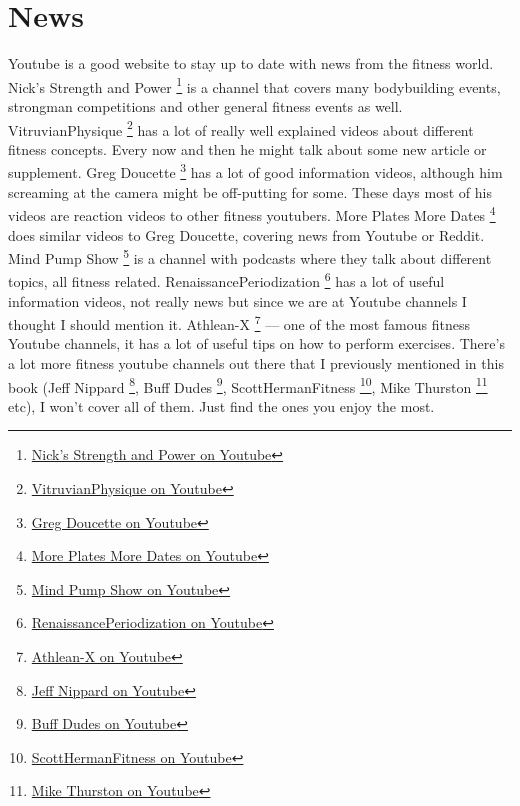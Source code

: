 \documentclass[openany, 12pt]{book}
\begin{document}
  	\section{News}

        Youtube is a good website to stay up to date with news from the fitness world. Nick's Strength and Power
        \footnote{\href{https://www.youtube.com/c/NicksStrengthandPower/videos}{Nick's Strength and Power on Youtube}} is a channel that covers many bodybuilding events, strongman competitions and
        other general fitness events as well. VitruvianPhysique
        \footnote{\href{https://www.youtube.com/user/VitruvianPhysique}{VitruvianPhysique on Youtube}} has a lot of really well explained videos about different fitness concepts. Every now
        and then he might talk about some new article or supplement. Greg Doucette
        \footnote{\href{https://www.youtube.com/user/gregdoucette/videos}{Greg Doucette on Youtube}} has a lot of good information videos, although him screaming at the camera might be
        off-putting for some. These days most of his videos are reaction videos to other fitness youtubers. More Plates More Dates
        \footnote{\href{https://www.youtube.com/c/MorePlatesMoreDates/videos}{More Plates More Dates on Youtube}} does similar videos to Greg Doucette, covering news from Youtube or
        Reddit. Mind Pump Show
        \footnote{\href{https://www.youtube.com/c/MindPumpShow/videos}{Mind Pump Show on Youtube}} is a channel with podcasts where they talk about different topics, all fitness related.
        RenaissancePeriodization
        \footnote{\href{https://www.youtube.com/c/RenaissancePeriodization/videos}{RenaissancePeriodization on Youtube}} has a lot of useful information videos, not really news but since we
        are at Youtube channels I thought I should mention it. Athlean-X
        \footnote{\href{https://www.youtube.com/c/athleanx/featured}{Athlean-X on Youtube}} --- one of the most famous fitness Youtube channels, it has a lot of useful tips on how to perform
        exercises. 
        There's a lot more fitness youtube channels out there that I previously mentioned in this book (Jeff Nippard
        \footnote{\href{https://www.youtube.com/c/JeffNippard}{Jeff Nippard on Youtube}}, Buff Dudes
        \footnote{\href{https://www.youtube.com/c/BuffDudesOfficial}{Buff Dudes on Youtube}}, ScottHermanFitness
        \footnote{\href{https://www.youtube.com/c/scottherman}{ScottHermanFitness on Youtube}}, Mike Thurston
        \footnote{\href{https://www.youtube.com/c/MikeThurston}{Mike Thurston on Youtube}} etc), I won't cover all of them. Just find the ones you enjoy the most.
\end{document}
